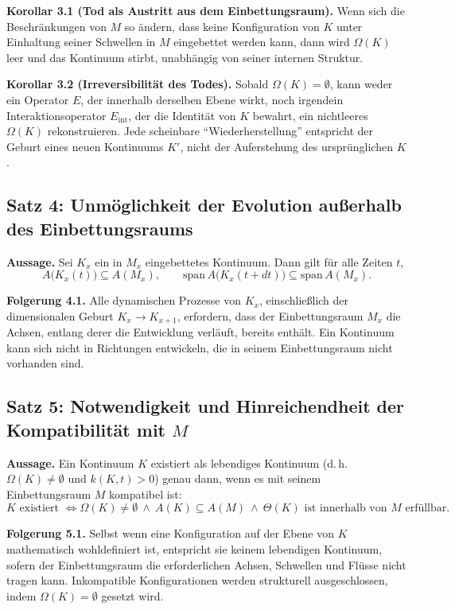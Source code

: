 \textbf{Korollar 3.1 (Tod als Austritt aus dem Einbettungsraum).}
Wenn sich die Beschränkungen von \(M\) so ändern, dass keine Konfiguration von \(K\) unter Einhaltung seiner Schwellen in \(M\) eingebettet werden kann, dann wird \(\Omega(K)\) leer und das Kontinuum stirbt, unabhängig von seiner internen Struktur.

\textbf{Korollar 3.2 (Irreversibilität des Todes).}
Sobald \(\Omega(K) = \emptyset\), kann weder ein Operator \(E\), der innerhalb derselben Ebene wirkt, noch irgendein Interaktionsoperator \(E_{\mathrm{int}}\), der die Identität von \(K\) bewahrt, ein nichtleeres \(\Omega(K)\) rekonstruieren.
Jede scheinbare ``Wiederherstellung'' entspricht der Geburt eines neuen Kontinuums \(K'\), nicht der Auferstehung des ursprünglichen \(K\).

\subsection{Satz 4: Unmöglichkeit der Evolution außerhalb des Einbettungsraums}

\textbf{Aussage.}
Sei \(K_x\) ein in \(M_x\) eingebettetes Kontinuum.
Dann gilt für alle Zeiten \(t\),
\[
    A\big(K_x(t)\big) \subseteq A(M_x),
    \qquad
    \mathrm{span}\,A\big(K_x(t+dt)\big) \subseteq \mathrm{span}\,A(M_x).
\]

\textbf{Folgerung 4.1.}
Alle dynamischen Prozesse von \(K_x\), einschließlich der dimensionalen Geburt \(K_x \to K_{x+1}\), erfordern, dass der Einbettungsraum \(M_x\) die Achsen, entlang derer die Entwicklung verläuft, bereits enthält.
Ein Kontinuum kann sich nicht in Richtungen entwickeln, die in seinem Einbettungsraum nicht vorhanden sind.

\subsection{Satz 5: Notwendigkeit und Hinreichendheit der Kompatibilität mit \texorpdfstring{$M$}{M}}

\textbf{Aussage.}
Ein Kontinuum \(K\) existiert als lebendiges Kontinuum (d.\,h.\ \(\Omega(K)\neq\emptyset\) und \(k(K,t)>0\)) genau dann, wenn es mit seinem Einbettungsraum \(M\) kompatibel ist:
\[
    K \text{ existiert }
    \Longleftrightarrow
    \Omega(K) \neq \emptyset
    \ \wedge\
    A(K) \subseteq A(M)
    \ \wedge\
    \Theta(K) \text{ ist innerhalb von } M \text{ erfüllbar}.
\]

\textbf{Folgerung 5.1.}
Selbst wenn eine Konfiguration auf der Ebene von \(K\) mathematisch wohldefiniert ist, entspricht sie keinem lebendigen Kontinuum, sofern der Einbettungsraum die erforderlichen Achsen, Schwellen und Flüsse nicht tragen kann.
Inkompatible Konfigurationen werden strukturell ausgeschlossen, indem \(\Omega(K) = \emptyset\) gesetzt wird.

